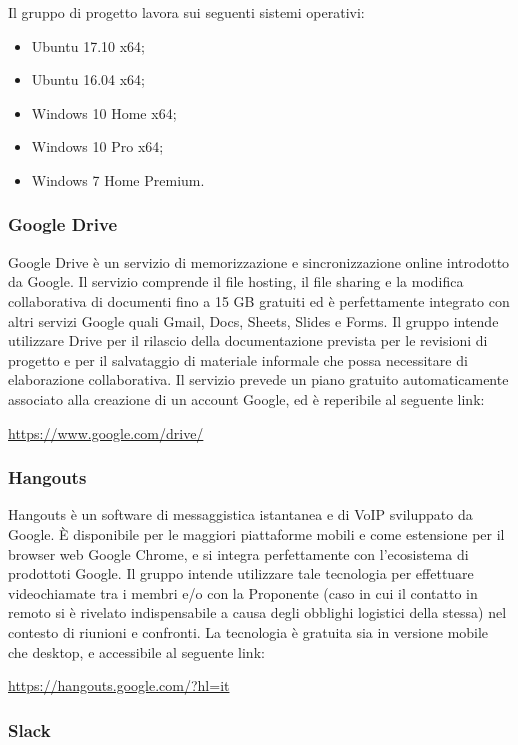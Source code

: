 \documentclass[../NormediProgetto.tex]{subfiles}
\begin{document}
	Il gruppo di progetto lavora sui seguenti sistemi operativi:
	\begin{itemize}
		\item Ubuntu 17.10 x64;
		\item Ubuntu 16.04  x64;
		\item Windows 10 Home x64;
		\item Windows 10 Pro x64;
		\item Windows 7 Home Premium.
	\end{itemize}

	\subsubsection{Google Drive}
	Google Drive è un servizio di memorizzazione e sincronizzazione online introdotto da Google. Il servizio comprende il file hosting, il file sharing e la modifica collaborativa di documenti fino a 15 GB gratuiti ed è perfettamente integrato con altri servizi Google quali Gmail, Docs, Sheets, Slides e Forms. Il gruppo intende utilizzare Drive per il rilascio della documentazione prevista per le revisioni di progetto e per il salvataggio di materiale informale che possa necessitare di elaborazione collaborativa. Il servizio prevede un piano gratuito automaticamente associato alla creazione di un account Google, ed è reperibile al seguente link:
	\begin{center}
		\url{https://www.google.com/drive/}
	\end{center}
	
	\subsubsection{Hangouts}
	Hangouts è un software di messaggistica istantanea e di VoIP sviluppato da Google. È disponibile per le maggiori piattaforme mobili e come estensione per il browser web Google Chrome, e si integra perfettamente con l'ecosistema di prodottoti Google. Il gruppo intende utilizzare tale tecnologia per effettuare videochiamate tra i membri e/o con la Proponente (caso in cui il contatto in remoto si è rivelato indispensabile a causa degli obblighi logistici della stessa) nel contesto di riunioni e confronti. La tecnologia è gratuita sia in versione mobile che desktop, e accessibile al seguente link:
	\begin{center}
		\url{https://hangouts.google.com/?hl=it}
	\end{center}
	
	\subsubsection{Slack}
	
\end{document}
